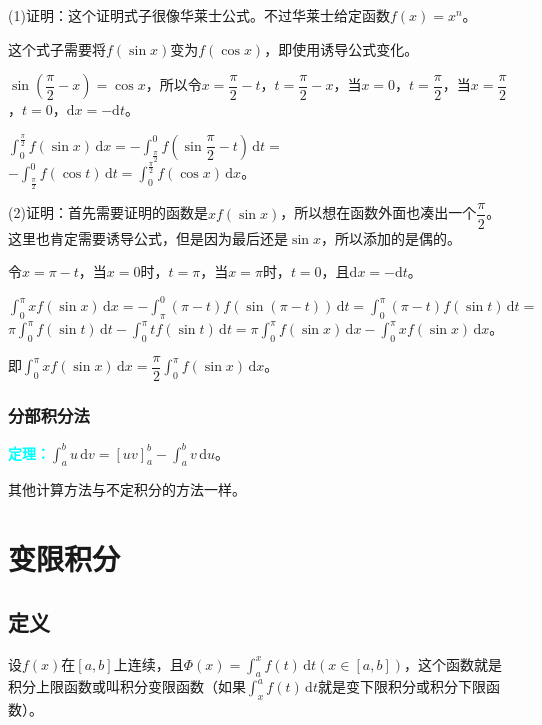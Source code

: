\documentclass[UTF8, 12pt]{ctexart}
\begin{document}
(1)证明：这个证明式子很像华莱士公式。不过华莱士给定函数$f(x)=x^n$。

这个式子需要将$f(\sin x)$变为$f(\cos x)$，即使用诱导公式变化。

$\sin\left(\dfrac{\pi}{2}-x\right)=\cos x$，所以令$x=\dfrac{\pi}{2}-t$，$t=\dfrac{\pi}{2}-x$，当$x=0$，$t=\dfrac{\pi}{2}$，当$x=\dfrac{\pi}{2}$，$t=0$，$\textrm{d}x=-\textrm{d}t$。

$\int_0^\frac{\pi}{2}f(\sin x)\,\textrm{d}x=-\displaystyle{\int_\frac{\pi}{2}^0f\left(\sin\dfrac{\pi}{2}-t\right)\,\textrm{d}t}=$$-\int_\frac{\pi}{2}^0f(\cos t)\,\textrm{d}t=\int^\frac{\pi}{2}_0f(\cos x)\,\textrm{d}x$。

(2)证明：首先需要证明的函数是$xf(\sin x)$，所以想在函数外面也凑出一个$\dfrac{\pi}{2}$。这里也肯定需要诱导公式，但是因为最后还是$\sin x$，所以添加的是偶的。

令$x=\pi-t$，当$x=0$时，$t=\pi$，当$x=\pi$时，$t=0$，且$\textrm{d}x=-\textrm{d}t$。

$\int_0^\pi xf(\sin x)\,\textrm{d}x=-\int_\pi^0(\pi-t)f(\sin(\pi-t))\,\textrm{d}t=\int_0^\pi(\pi-t)f(\sin t)\,\textrm{d}t=$\\$\pi\int_0^\pi f(\sin t)\,\textrm{d}t-\int_0^\pi tf(\sin t)\,\textrm{d}t=\pi\int_0^\pi f(\sin x)\,\textrm{d}x-\int_0^\pi xf(\sin x)\,\textrm{d}x$。

即$\int_0^\pi xf(\sin x)\,\textrm{d}x=\dfrac{\pi}{2}\int_0^\pi f(\sin x)\,\textrm{d}x$。

\subsubsection{分部积分法}

\textcolor{aqua}{\textbf{定理：}}$\int_a^bu\,\textrm{d}v=[uv]_a^b-\int_a^bv\,\textrm{d}u$。

其他计算方法与不定积分的方法一样。

\section{变限积分}

\subsection{定义}

设$f(x)$在$[a,b]$上连续，且$\Phi(x)=\int_a^xf(t)\,\textrm{d}t(x\in[a,b])$，这个函数就是积分上限函数或叫积分变限函数（如果$\int_x^af(t)\,\textrm{d}t$就是变下限积分或积分下限函数）。
\end{document}
